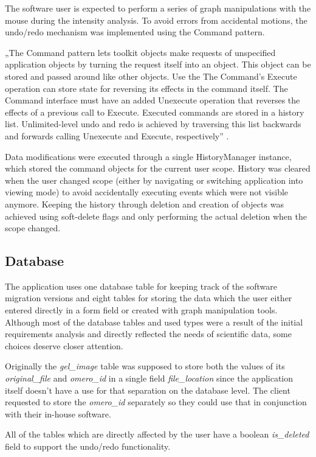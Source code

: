 The software user is expected to perform a series of graph manipulations with the mouse during the intensity analysis. To avoid errors from accidental motions, the undo/redo mechanism was implemented using the Command pattern.

„The Command pattern lets toolkit objects make requests of unspecified application objects by turning the request itself into an object. This object can be stored and passed around like other objects. Use the The Command's Execute operation can store state for reversing its effects in the command itself. The Command interface must have an added Unexecute operation that reverses the effects of a previous call to Execute. Executed commands are stored in a history list. Unlimited-level undo and redo is achieved by traversing this list backwards and forwards calling Unexecute and Execute, respectively” \cite{gof-command}.

Data modifications were executed through a single HistoryManager instance, which stored the command objects for the current user scope. History was cleared when the user changed scope (either by navigating or switching application into viewing mode) to avoid accidentally executing events which were not visible anymore. Keeping the history through deletion and creation of objects was achieved using soft-delete flags and only performing the actual deletion when the scope changed.

\subsection{Database}

The application uses one database table for keeping track of the software migration versions and eight tables for storing the data which the user either entered directly in a form field or created with graph manipulation tools. Although most of the database tables and used types were a result of the initial requirements analysis and directly reflected the needs of scientific data, some choices deserve closer attention.

Originally the \emph{gel\_image} table was supposed to store both the values of its \emph{original\_file} and \emph{omero\_id} in a single field \emph{file\_location} since the application itself doesn't have a use for that separation on the database level. The client requested to store the \emph{omero\_id} separately so they could use that in conjunction with their in-house software.

All of the tables which are directly affected by the user have a boolean \emph{is\_deleted} field to support the undo/redo functionality.

